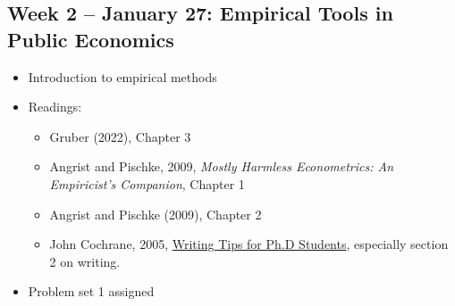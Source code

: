 \documentclass[11pt]{article}
\begin{document}
\subsection*{Week 2 -- January 27: Empirical Tools in Public Economics}
\begin{itemize}
    \setlength{\itemsep}{0em}
    \item Introduction to empirical methods
    \item Readings:
    \begin{itemize}
        \item Gruber (2022), Chapter 3
        \item Angrist and Pischke, 2009, \textit{Mostly Harmless Econometrics: An Empiricist's Companion}, Chapter 1
        \item Angrist and Pischke (2009), Chapter 2
        \item John Cochrane, 2005, \href{https://static1.squarespace.com/static/5e6033a4ea02d801f37e15bb/t/5eda74919c44fa5f87452697/1591374993570/phd_paper_writing.pdf}{Writing Tips for Ph.D Students}, especially section 2 on writing.
    \end{itemize}
    \item Problem set 1 assigned
\end{itemize}
\end{document}
